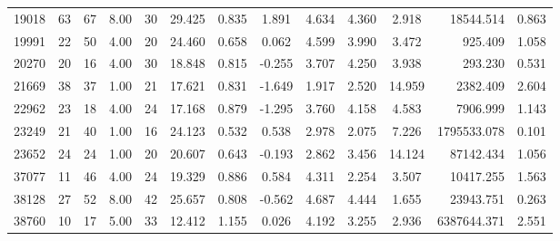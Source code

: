 \documentclass[mnsc]{informs3}
\begin{document}
\begin{APPENDICES}
\begin{longtable}{cccccccccccrc}
19018 & 63 & 67 & 8.00 & 30 & 29.425 & 0.835 & 1.891 & 4.634 & 4.360 & 2.918 & 18544.514 & 0.863 \\
19991 & 22 & 50 & 4.00 & 20 & 24.460 & 0.658 & 0.062 & 4.599 & 3.990 & 3.472 & 925.409 & 1.058 \\
20270 & 20 & 16 & 4.00 & 30 & 18.848 & 0.815 & -0.255 & 3.707 & 4.250 & 3.938 & 293.230 & 0.531 \\
21669 & 38 & 37 & 1.00 & 21 & 17.621 & 0.831 & -1.649 & 1.917 & 2.520 & 14.959 & 2382.409 & 2.604 \\
22962 & 23 & 18 & 4.00 & 24 & 17.168 & 0.879 & -1.295 & 3.760 & 4.158 & 4.583 & 7906.999 & 1.143 \\
23249 & 21 & 40 & 1.00 & 16 & 24.123 & 0.532 & 0.538 & 2.978 & 2.075 & 7.226 & 1795533.078 & 0.101 \\
23652 & 24 & 24 & 1.00 & 20 & 20.607 & 0.643 & -0.193 & 2.862 & 3.456 & 14.124 & 87142.434 & 1.056 \\
37077 & 11 & 46 & 4.00 & 24 & 19.329 & 0.886 & 0.584 & 4.311 & 2.254 & 3.507 & 10417.255 & 1.563 \\
38128 & 27 & 52 & 8.00 & 42 & 25.657 & 0.808 & -0.562 & 4.687 & 4.444 & 1.655 & 23943.751 & 0.263 \\
38760 & 10 & 17 & 5.00 & 33 & 12.412 & 1.155 & 0.026 & 4.192 & 3.255 & 2.936 & 6387644.371 & 2.551 \\
\bottomrule
\end{longtable}

\end{APPENDICES}










%



\end{document}
